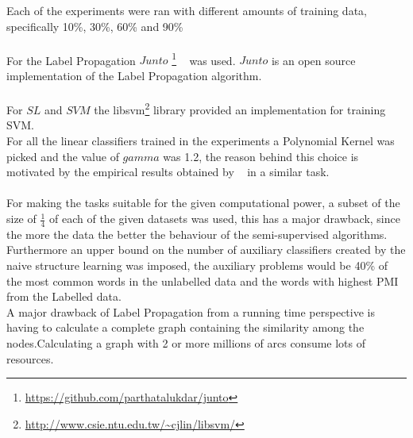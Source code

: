 \documentclass[4pt,a4paper,twocolumn]{article}
\begin{document}
Each of the experiments were ran with different amounts of training data, specifically 10\%, 30\%, 60\% and 90\%\\
\\
For the Label Propagation  $Junto$ \footnote{ \url{https://github.com/parthatalukdar/junto} } ~\cite{Talukdar:2010:EGS:1858681.1858830} was used. $Junto$ is an open source implementation of the Label Propagation algorithm.\\
\\
For $SL$ and $SVM$ the libsvm\footnote{\url{http://www.csie.ntu.edu.tw/~cjlin/libsvm/}} library provided an implementation for training SVM.\\
For all the linear classifiers trained in the experiments a  Polynomial Kernel was picked and the value of $gamma$ was 1.2, the reason behind this choice is motivated by the empirical results obtained by ~\cite{Joachims:1998:TCS:645326.649721} in a similar task.\\
\\
For making the tasks suitable for the given computational power, a subset of the size of $\frac{1}{4}$ of each of the given datasets was used, this has a major drawback, since the more the data the better the behaviour of the semi-supervised algorithms.
Furthermore an upper bound on the number of auxiliary classifiers created by  the naive structure learning was imposed, the auxiliary problems would be 40\% of the most common words in the unlabelled data and the words with highest PMI from the Labelled data.\\
A major drawback of Label Propagation from a running time perspective is having to calculate a complete graph containing the similarity among the nodes.Calculating a graph with 2 or more millions of arcs consume lots of resources.
\end{document}
